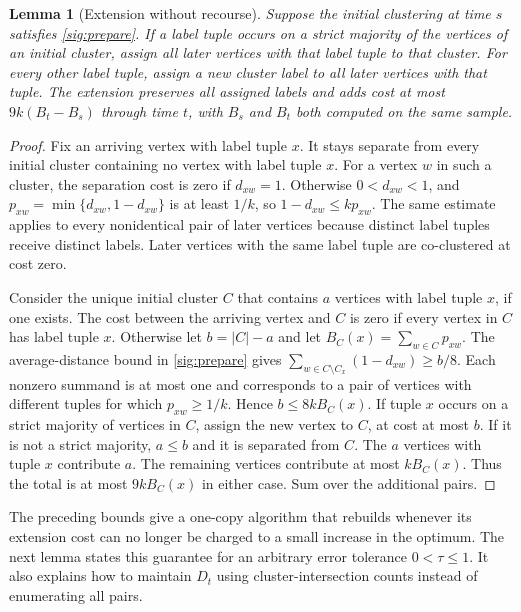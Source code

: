 \documentclass[11pt]{article}
\newtheorem{lemma}[theorem]{Lemma}
\begin{document}
\begin{lemma}[Extension without recourse]
\label{sig:extend}
Suppose the initial clustering at time $s$ satisfies \cref{sig:prepare}.
If a label tuple occurs on a strict majority of the vertices of an initial cluster, assign all
later vertices with that label tuple to that cluster. For every other label tuple,
assign a new cluster label to all later vertices
with that tuple. The extension
preserves all assigned labels and adds cost at most
$9k(B_t-B_s)$ through time $t$, with $B_s$ and $B_t$ both computed on the same sample.
\end{lemma}
\begin{proof}
Fix an arriving vertex with label tuple $x$. It stays separate from every
initial cluster containing no vertex with label tuple $x$. For a vertex $w$
in such a cluster, the separation cost is zero if $d_{xw}=1$.
Otherwise $0<d_{xw}<1$, and $p_{xw}=\min\{d_{xw},1-d_{xw}\}$
is at least $1/k$, so $1-d_{xw}\le k p_{xw}$. The same estimate applies to every nonidentical pair of later
vertices because distinct label tuples receive distinct labels.
Later vertices with the same label tuple are co-clustered at cost zero.

Consider the unique initial cluster $C$ that contains $a$ vertices
with label tuple $x$, if one exists. The cost between the arriving vertex and $C$ is zero if every vertex
in $C$ has label tuple $x$. Otherwise let $b=|C|-a$ and let
$B_C(x)=\sum_{w\in C}p_{xw}$.
The average-distance bound in \cref{sig:prepare} gives
$\sum_{w\in C\setminus C_x}(1-d_{xw})\ge b/8$. Each nonzero summand
is at most one and corresponds to a pair of vertices with different tuples for which
$p_{xw}\ge1/k$. Hence $b\le8kB_C(x)$.
If tuple $x$ occurs on a strict majority of vertices in $C$, assign the new
vertex to $C$, at cost at most $b$.
If it is not a strict majority, $a\le b$ and it is separated from $C$.
The $a$ vertices with tuple $x$ contribute $a$. The remaining vertices
contribute at most $k B_C(x)$. Thus the total is at most $9kB_C(x)$
in either case. Sum over the additional pairs.
\end{proof}

The preceding bounds give a one-copy algorithm that rebuilds whenever
its extension cost can no longer be charged to a small increase in the
optimum. The next lemma states this guarantee for an arbitrary error
tolerance $0<\tau\le1$. It also explains how to maintain $D_t$
using cluster-intersection counts instead of enumerating all pairs.
\end{document}
